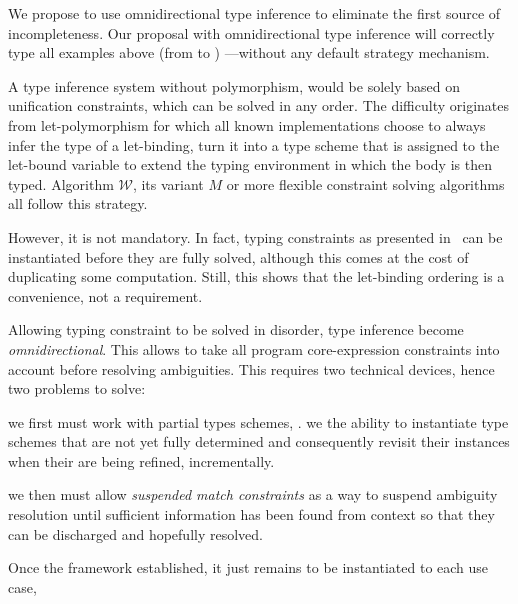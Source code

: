 \documentclass[acmsmall,screen,nonacm]{acmart}
\begin{document}
We propose to use omnidirectional type inference to eliminate the first
source of incompleteness.  Our proposal with omnidirectional type inference
will correctly type all examples above (from  to
)\ignorespaces
{}
---without any default strategy mechanism.

A type inference system without polymorphism, would be solely based on
unification constraints, which can be solved in any order.  The difficulty
originates from \ML let-polymorphism for which all known implementations
choose to always infer the type of a let-binding, turn it into a type scheme
that is assigned to the let-bound variable to extend the typing environment
in which the body is then typed. Algorithm $\mathscr{W}$, its variant $M$ 
or more flexible constraint solving algorithms all follow this strategy.

However, it is not mandatory.  In fact, typing constraints as presented
in~\cite {Pottier-Remy/emlti} can be instantiated before they are fully
solved, although this comes at the cost of duplicating some computation.
Still, this shows that the let-binding ordering is a convenience, not a
requirement.

Allowing typing constraint to be solved in disorder, type inference become
\emph{omnidirectional}.  This allows to take all program core-expression
constraints into account before resolving ambiguities.  This requires two
technical devices, hence two problems to solve:
\begin{enumerate*}
\item
  we first must work with partial types schemes, \ie.  we the ability
  to instantiate type schemes that are not yet fully determined and
  consequently revisit their instances when their are being refined,
  incrementally.
\item
  we then must allow \emph{suspended match constraints} as a way to suspend
  ambiguity resolution until sufficient information has been found from
  context so that they can be discharged and hopefully resolved.

\end{enumerate*}
Once the framework established, it just remains to be instantiated
to each use case,
\end{document}
